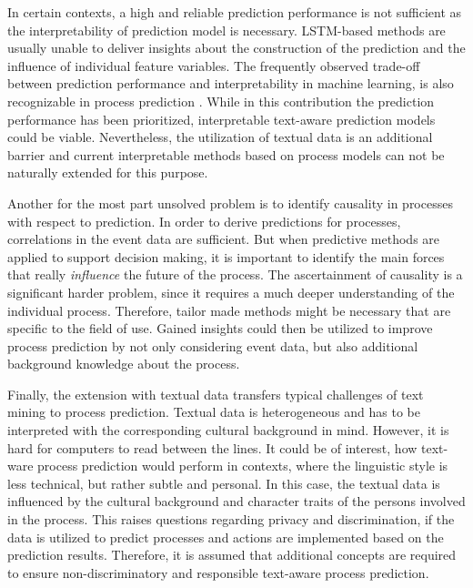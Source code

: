 In certain contexts, a high and reliable prediction performance is not sufficient as the interpretability of prediction model is necessary.
LSTM-based methods are usually unable to deliver insights about the construction of the prediction and the influence of individual feature variables.
The frequently observed trade-off between prediction performance and interpretability in machine learning, is also recognizable in process prediction \cite{DBLP:journals/sosym/TaxTZ20}.
While in this contribution the prediction performance has been prioritized, interpretable text-aware prediction models could be viable.
Nevertheless, the utilization of textual data is an additional barrier and current interpretable methods based on process models can not be naturally extended for this purpose.

Another for the most part unsolved problem is to identify causality in processes with respect to prediction.
In order to derive predictions for processes, correlations in the event data are sufficient.
But when predictive methods are applied to support decision making, it is important to identify the main forces that really \textit{influence} the future of the process.
The ascertainment of causality is a significant harder problem, since it requires a much deeper understanding of the individual process.
Therefore, tailor made methods might be necessary that are specific to the field of use.
Gained insights could then be utilized to improve process prediction by not only considering event data, but also additional background knowledge about the process.

Finally, the extension with textual data transfers typical challenges of text mining to process prediction.
Textual data is heterogeneous and has to be interpreted with the corresponding cultural background in mind.
However, it is hard for computers to read between the lines.
It could be of interest, how text-ware process prediction would perform in contexts, where the linguistic style is less technical, but rather subtle and personal.
In this case, the textual data is influenced by the cultural background and character traits of the persons involved in the process.
This raises questions regarding privacy and discrimination, if the data is utilized to predict processes and actions are implemented based on the prediction results.
Therefore, it is assumed that additional concepts are required to ensure non-discriminatory and responsible text-aware process prediction.